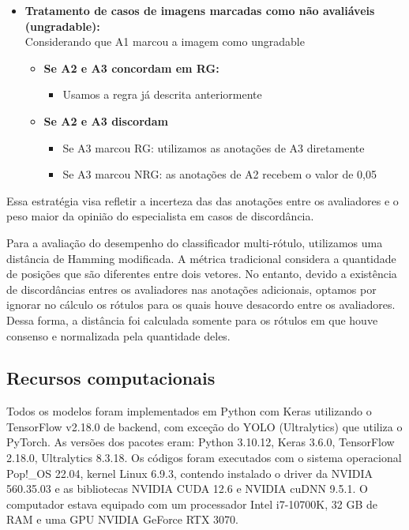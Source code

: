 \documentclass[12pt]{article}
\begin{document}
\begin{itemize}[noitemsep]
    \item \textbf{Tratamento de casos de imagens marcadas como não avaliáveis (ungradable):}\\
    Considerando que A1 marcou a imagem como ungradable
    \begin{itemize}[noitemsep]
        \item \textbf{Se A2 e A3 concordam em RG:}
        \begin{itemize}[noitemsep]
            \item Usamos a regra já descrita anteriormente
        \end{itemize}
        
        \item \textbf{Se A2 e A3 discordam}
        \begin{itemize}[noitemsep]
            \item Se A3 marcou RG: utilizamos as anotações de A3 diretamente
            \item Se A3 marcou NRG: as anotações de A2 recebem o valor de 0,05
        \end{itemize}
    \end{itemize}
    
\end{itemize}

Essa estratégia visa refletir a incerteza das das anotações entre os avaliadores e o peso maior da opinião do especialista em casos de discordância.

Para a avaliação do desempenho do classificador multi-rótulo, utilizamos uma distância de Hamming modificada. A métrica tradicional considera a quantidade de posições que são diferentes entre dois vetores. No entanto, devido a existência de discordâncias entres os avaliadores nas anotações adicionais, optamos por ignorar no cálculo os rótulos para os quais houve desacordo entre os avaliadores. Dessa forma, a distância foi calculada somente para os rótulos em que houve consenso e normalizada pela quantidade deles. 





\subsection{Recursos computacionais}
\label{sec:resources}

Todos os modelos foram implementados em Python com Keras utilizando o TensorFlow v2.18.0 de backend, com exceção do YOLO (Ultralytics) que utiliza o PyTorch. As versões dos pacotes eram: Python 3.10.12, Keras 3.6.0, TensorFlow 2.18.0, Ultralytics 8.3.18.
Os códigos foram executados com o sistema operacional Pop!\_OS 22.04, kernel Linux 6.9.3, contendo instalado o driver da NVIDIA 560.35.03 e as bibliotecas NVIDIA CUDA 12.6 e NVIDIA cuDNN 9.5.1.
O computador estava equipado com um processador Intel i7-10700K, 32 GB de RAM e uma GPU NVIDIA GeForce RTX 3070.
\end{document}
